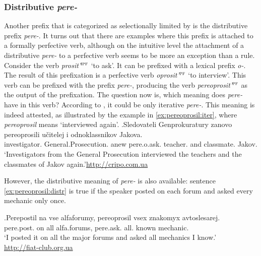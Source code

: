 \subsubsection{Distributive \textit{pere-}}
Another prefix that is categorized as selectionally limited by \citet{Tatevosov:09} is the distributive prefix \textit{pere-}. It turns out that there are examples where this prefix is attached to a formally perfective verb, although on the intuitive level the attachment of a distributive \textit{pere-} to a perfective verb seems to be more an exception than a rule. Consider the verb \textit{prosit'}$^{\textsc{ipf}}$ `to ask'. It can be prefixed with a lexical prefix \textit{o-}. The result of this prefixation is a perfective verb \textit{oprosit'}$^{\textsc{pf}}$ `to interview'. This verb can be prefixed with the prefix \textit{pere-}, producing the verb \textit{pereoprosit'}$^{\textsc{pf}}$ as the output of the prefixation. The question now is, which meaning does \textit{pere-} have in this verb? According to \citet{Tatevosov:09}, it could be only iterative \textit{pere-}. This meaning is indeed attested, as illustrated by the example in \ref{ex:pereoprosil:iter}, where \textit{pereoprosil} means `interviewed again'.
\exg.\label{ex:pereoprosil:iter}Sledovateli Genprokuratury zanovo pereoprosili u\v{c}itelej i odnoklassnikov Jakova.\\
investigator. General.Prosecution. anew pere.o.ask. teacher. and classmate. Jakov.\\
\trans `Investigators from the General Prosecution interviewed the teachers and the classmates of Jakov again.'\hbox{}\hfill\hbox{\url{http://cripo.com.ua}}

However, the distributive meaning of \textit{pere-} is also available: sentence \ref{ex:pereoprosil:distr} is true if the speaker posted on each forum and asked every mechanic only once.

\exg.\label{ex:pereoprosil:distr}Perepostil na vse alfaforumy, pereoprosil vsex znakomyx avtoslesarej.\\ 
pere.post. on all {alfa.forums}, pere.ask. all. known mechanic.\\
\trans `I posted it on all the major forums and asked all mechanics I know.'\\\hbox{}\hfill\hbox{\url{http://fiat-club.org.ua}}

